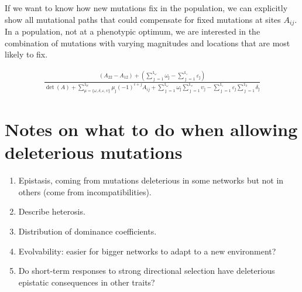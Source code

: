 \documentclass[11 pt]{article}
\newcommand{\ind}{\mathds{1}}
\begin{document}

  If we want to know how new mutations fix in the population, we can explicitly show all mutational paths that could compensate for fixed mutations at sites $A_{ij}$. In a population, not at a phenotypic optimum, we are interested in the combination of mutations with varying magnitudes and locations that are most likely to fix. 

  \begin{align*}
    \frac{\left(A_{22}-A_{12}\right) + \left( \displaystyle\sum_{\jmath = 1}^{\ind_{\omega}} \omega_{\jmath} - \displaystyle\sum_{\jmath = 1}^{\ind_{\varepsilon}} \varepsilon_{\jmath} \right)}{\det(A) + \displaystyle\sum_{\mu=\{\omega , \delta , \varepsilon , \upsilon \}}^{\ind_{\mu}} \mu_{\jmath} (-1)^{i+j} A_{ij} + \sum_{\jmath=1}^{\ind_{\omega}} \omega_{\jmath} \sum_{\jmath=1}^{\ind_{\upsilon}} \upsilon_{\jmath} - \sum_{\jmath=1}^{\ind_{\varepsilon}} \varepsilon_{\jmath} \sum_{\jmath=1}^{\ind_{\delta}} \delta_{\jmath} }
  \end{align*}

\section{Notes on what to do when allowing deleterious mutations} 

\begin{enumerate}

    \item Epistasis, coming from mutations deleterious in some networks but not in others
(come from incompatibilities).

    \item Describe heterosis.

    \item Distribution of dominance coefficients.

    \item Evolvability: easier for bigger networks to adapt to a new environment?

    \item Do short-term responses to strong directional selection have deleterious epistatic consequences in other traits?

\end{enumerate}



\end{document}
